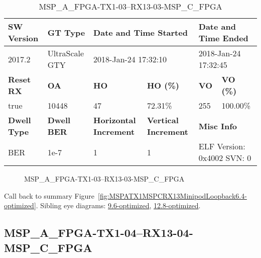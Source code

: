 \begin{table}[h]
\centering
\caption{MSP\_A\_FPGA-TX1-03--RX13-03-MSP\_C\_FPGA}
\label{tab:MSPAFPGATX103RX1303MSPCFPGA6.4-optimized}
\begin{tabular}{@{}|l|l|l|l|l|l|@{}}
\toprule
\textbf{SW Version}                & \textbf{GT Type}   & \multicolumn{2}{l|}{\textbf{Date and Time Started}}            & \multicolumn{2}{l|}{\textbf{Date and Time Ended}}        \\ \midrule
2017.2                       & UltraScale GTY          & \multicolumn{2}{l|}{2018-Jan-24 17:32:10}                   & \multicolumn{2}{l|}{2018-Jan-24 17:32:45}               \\ \midrule
\textbf{Reset RX}                  & \textbf{OA} & \textbf{HO}   & \textbf{HO (\%)} & \textbf{VO} & \textbf{VO (\%)} \\ \midrule
true & 10448        & 47          & 72.31\%        & 255        & 100.00\%       \\ \midrule
\textbf{Dwell Type}                & \textbf{Dwell BER} & \textbf{Horizontal Increment} & \textbf{Vertical Increment}    & \multicolumn{2}{l|}{\textbf{Misc Info}}                  \\ \midrule
BER                            & 1e-7        & 1        & 1           & \multicolumn{2}{l|}{ELF Version: 0x4002 SVN: 0}                         \\ \bottomrule
\end{tabular}
\end{table}

\begin{figure}[h]
\caption{MSP\_A\_FPGA-TX1-03--RX13-03-MSP\_C\_FPGA} \label{fig:MSPAFPGATX103RX1303MSPCFPGA6.4-optimized}
\end{figure}

Call back to summary Figure~\ref{fig:MSPATX1MSPCRX13MinipodLoopback6.4-optimized}.
Sibling eye diagrams: \hyperref[sec:MSPAFPGATX103RX1303MSPCFPGA9.6-optimized]{9.6-optimized}, \hyperref[sec:MSPAFPGATX103RX1303MSPCFPGA12.8-optimized]{12.8-optimized}.

\clearpage
\newpage


\subsection{MSP\_A\_FPGA-TX1-04--RX13-04-MSP\_C\_FPGA}\label{sec:MSPAFPGATX104RX1304MSPCFPGA6.4-optimized}

